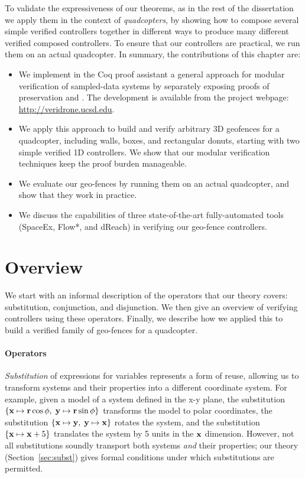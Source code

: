 To validate the expressiveness of our theorems, as in the rest of the
dissertation we apply them in the context of \emph{quadcopters}, by showing
how to compose several simple verified controllers together in different
ways to produce many different verified composed controllers.  To ensure
that our controllers are practical, we run them on an actual quadcopter.
In summary, the contributions of this chapter are:
\begin{itemize}
\setlength\itemsep{0.01em}
\item We implement in the Coq proof assistant a general approach for modular verification of sampled-data systems by separately exposing proofs of preservation and \progress{}. The development is available from the project webpage: \url{http://veridrone.ucsd.edu}.
\item We apply this approach to build and verify arbitrary 3D geofences for a quadcopter, including walls, boxes, and rectangular donuts, starting with two simple verified 1D controllers.
We show that our modular verification techniques keep the proof burden manageable.
\item We evaluate our geo-fences by running them on an actual quadcopter, and show that they work in practice.
\item We discuss the capabilities of three state-of-the-art fully-automated tools (SpaceEx, Flow*, and dReach) in verifying our geo-fence controllers.
\end{itemize}

\section{Overview}
We start with an informal description of the operators that our theory
covers: substitution, conjunction, and disjunction.  We then give an
overview of verifying controllers using these operators.  Finally, we
describe how we applied this to build a verified family of geo-fences for a
quadcopter.

\paragraph*{Operators}
\emph{Substitution} of expressions for variables represents a form of
reuse, allowing us to transform systems and their properties into a
different coordinate system.  For example, given a model of a system
defined in the x-y plane, the substitution $\{\mathbf{x} \mapsto \mathbf{r}
\cos \mathbf{\phi},\; \mathbf{y} \mapsto \mathbf{r} \sin \mathbf{\phi}\}$
transforms the model to polar coordinates, the substitution $\{\mathbf{x}
\mapsto \mathbf{y},\; \mathbf{y} \mapsto \mathbf{x}\}$ rotates the system,
and the substitution $\{\mathbf{x} \mapsto \mathbf{x} + 5\}$ translates the
system by 5 units in the $\mathbf{x}$ dimension.  However, not all
substitutions soundly transport both systems \emph{and} their properties;
our theory (Section~\ref{sec:subst}) gives formal conditions under which
substitutions are permitted.

